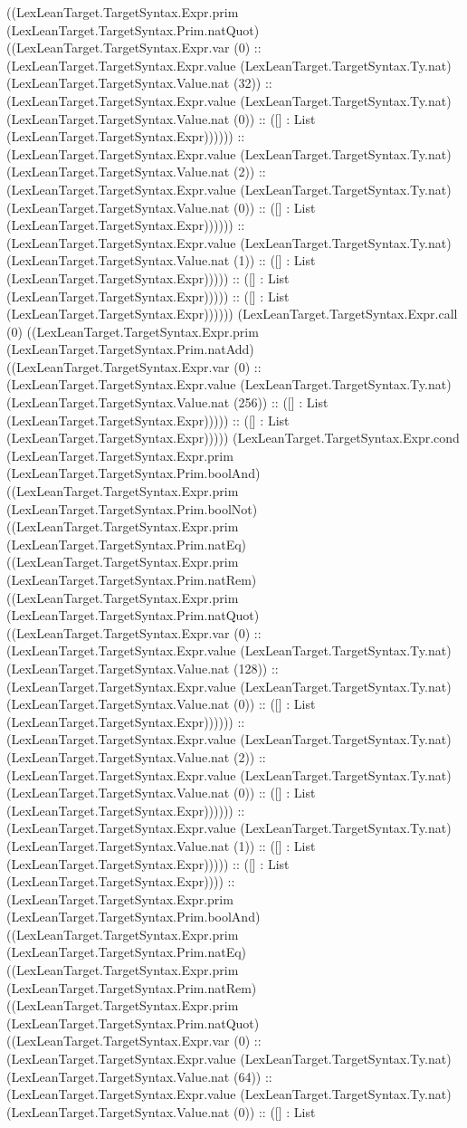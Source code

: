 \documentclass[11pt]{article}
\begin{document}
((LexLeanTarget.TargetSyntax.Expr.prim (LexLeanTarget.TargetSyntax.Prim.natQuot) ((LexLeanTarget.TargetSyntax.Expr.var (0) :: (LexLeanTarget.TargetSyntax.Expr.value (LexLeanTarget.TargetSyntax.Ty.nat) (LexLeanTarget.TargetSyntax.Value.nat (32)) :: (LexLeanTarget.TargetSyntax.Expr.value (LexLeanTarget.TargetSyntax.Ty.nat) (LexLeanTarget.TargetSyntax.Value.nat (0)) :: ([] : List (LexLeanTarget.TargetSyntax.Expr)))))) :: (LexLeanTarget.TargetSyntax.Expr.value (LexLeanTarget.TargetSyntax.Ty.nat) (LexLeanTarget.TargetSyntax.Value.nat (2)) :: (LexLeanTarget.TargetSyntax.Expr.value (LexLeanTarget.TargetSyntax.Ty.nat) (LexLeanTarget.TargetSyntax.Value.nat (0)) :: ([] : List (LexLeanTarget.TargetSyntax.Expr)))))) :: (LexLeanTarget.TargetSyntax.Expr.value (LexLeanTarget.TargetSyntax.Ty.nat) (LexLeanTarget.TargetSyntax.Value.nat (1)) :: ([] : List (LexLeanTarget.TargetSyntax.Expr))))) :: ([] : List (LexLeanTarget.TargetSyntax.Expr))))) :: ([] : List (LexLeanTarget.TargetSyntax.Expr)))))) (LexLeanTarget.TargetSyntax.Expr.call (0) ((LexLeanTarget.TargetSyntax.Expr.prim (LexLeanTarget.TargetSyntax.Prim.natAdd) ((LexLeanTarget.TargetSyntax.Expr.var (0) :: (LexLeanTarget.TargetSyntax.Expr.value (LexLeanTarget.TargetSyntax.Ty.nat) (LexLeanTarget.TargetSyntax.Value.nat (256)) :: ([] : List (LexLeanTarget.TargetSyntax.Expr))))) :: ([] : List (LexLeanTarget.TargetSyntax.Expr))))) (LexLeanTarget.TargetSyntax.Expr.cond (LexLeanTarget.TargetSyntax.Expr.prim (LexLeanTarget.TargetSyntax.Prim.boolAnd) ((LexLeanTarget.TargetSyntax.Expr.prim (LexLeanTarget.TargetSyntax.Prim.boolNot) ((LexLeanTarget.TargetSyntax.Expr.prim (LexLeanTarget.TargetSyntax.Prim.natEq) ((LexLeanTarget.TargetSyntax.Expr.prim (LexLeanTarget.TargetSyntax.Prim.natRem) ((LexLeanTarget.TargetSyntax.Expr.prim (LexLeanTarget.TargetSyntax.Prim.natQuot) ((LexLeanTarget.TargetSyntax.Expr.var (0) :: (LexLeanTarget.TargetSyntax.Expr.value (LexLeanTarget.TargetSyntax.Ty.nat) (LexLeanTarget.TargetSyntax.Value.nat (128)) :: (LexLeanTarget.TargetSyntax.Expr.value (LexLeanTarget.TargetSyntax.Ty.nat) (LexLeanTarget.TargetSyntax.Value.nat (0)) :: ([] : List (LexLeanTarget.TargetSyntax.Expr)))))) :: (LexLeanTarget.TargetSyntax.Expr.value (LexLeanTarget.TargetSyntax.Ty.nat) (LexLeanTarget.TargetSyntax.Value.nat (2)) :: (LexLeanTarget.TargetSyntax.Expr.value (LexLeanTarget.TargetSyntax.Ty.nat) (LexLeanTarget.TargetSyntax.Value.nat (0)) :: ([] : List (LexLeanTarget.TargetSyntax.Expr)))))) :: (LexLeanTarget.TargetSyntax.Expr.value (LexLeanTarget.TargetSyntax.Ty.nat) (LexLeanTarget.TargetSyntax.Value.nat (1)) :: ([] : List (LexLeanTarget.TargetSyntax.Expr))))) :: ([] : List (LexLeanTarget.TargetSyntax.Expr)))) :: (LexLeanTarget.TargetSyntax.Expr.prim (LexLeanTarget.TargetSyntax.Prim.boolAnd) ((LexLeanTarget.TargetSyntax.Expr.prim (LexLeanTarget.TargetSyntax.Prim.natEq) ((LexLeanTarget.TargetSyntax.Expr.prim (LexLeanTarget.TargetSyntax.Prim.natRem) ((LexLeanTarget.TargetSyntax.Expr.prim (LexLeanTarget.TargetSyntax.Prim.natQuot) ((LexLeanTarget.TargetSyntax.Expr.var (0) :: (LexLeanTarget.TargetSyntax.Expr.value (LexLeanTarget.TargetSyntax.Ty.nat) (LexLeanTarget.TargetSyntax.Value.nat (64)) :: (LexLeanTarget.TargetSyntax.Expr.value (LexLeanTarget.TargetSyntax.Ty.nat) (LexLeanTarget.TargetSyntax.Value.nat (0)) :: ([] : List 
\end{document}
